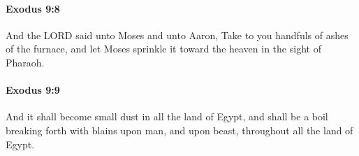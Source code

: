 		\paragraph{Exodus 9:8} %
			\label{EXODUS-9-8}

			And the LORD said unto Moses and unto Aaron, Take to you handfuls of ashes of the furnace, and let Moses sprinkle it toward the heaven in the sight of Pharaoh.


		\paragraph{Exodus 9:9} %
			\label{EXODUS-9-9}

			And it shall become small dust in all the land of Egypt, and shall be a boil breaking forth with blains upon man, and upon beast, throughout all the land of Egypt.


